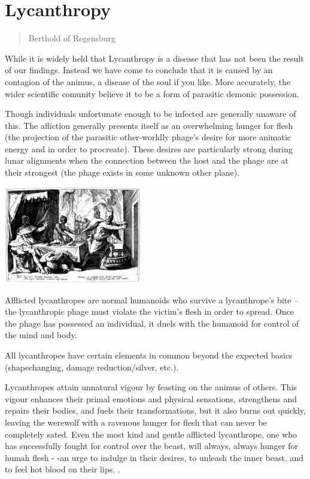 \documentclass[a4paper]{dnd5}
\begin{document}
\section*{Lycanthropy}
\begin{quotation}
Berthold of Regensburg
\end{quotation}


While it is widely held that Lycanthropy is a disease that has not been the result of our findings.  Instead we have come to conclude that it is caused by an contagion of 
the animus, a disease of the soul if you like.  More accurately, the wider scientific comunity believe it to be a form of parasitic demonic possession.  

Though individuals unfortunate enough to be infected are generally unaware of this.  The afliction generally presents itself as an overwhelming hunger for flesh (the projection of 
the parasitic other-worldly phage's desire for more animatic energy and in order to procreate).   These desires are particularly strong during lunar alignments when the connection between the host and the phage are at their strongest (the phage exists in some unknown other plane).


\begin{center}
 \includegraphics[width=0.45\textwidth]{lycaon.png}
\end{center}


Afflicted lycanthropes are normal humanoids who survive a lycanthrope's bite -- the lycanthropic phage must violate the victim's flesh in order to spread. Once the phage has possessed an individual, it duels with the humanoid for control of the mind and body.

All lycanthropes have certain elements in common beyond the expected basics (shapechanging, damage reduction/silver, etc.).

Lycanthropes attain unnatural vigour by feasting on the animus of others.  This vigour enhances their primal emotions and physical sensations, strengthens and repairs their bodies, and fuels their transformations, but it also burns out quickly, leaving the werewolf with a ravenous hunger for flesh that can never be completely sated. Even the most kind and gentle afflicted lycanthrope, one who has successfully fought for control over the beast, will always, always hunger for humah flesh - -an urge to indulge in their desires, to unleash the inner beast, and to feel hot blood on their lips. .
\end{document}
